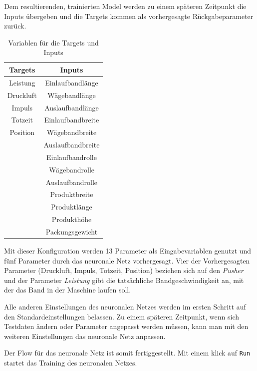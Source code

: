 Dem resultierenden, trainierten Model werden zu einem späteren Zeitpunkt die Inputs übergeben und die Targets kommen als
vorhergesagte Rückgabeparameter zurück.

\begin{table}[h]
    \centering
    \begin{tabular}{|c|c|}
        \hline
        \textbf{Targets} & \textbf{Inputs}\\
        \hline
        \hline
        Leistung & Einlaufbandlänge\\
        \hline
        Druckluft & Wägebandlänge\\
        \hline
        Impuls & Auslaufbandlänge\\
        \hline
        Totzeit & Einlaufbandbreite\\
        \hline
        Position & Wägebandbreite\\
        \hline
        & Auslaufbandbreite\\
        \hline
        & Einlaufbandrolle\\
        \hline
        & Wägebandrolle\\
        \hline
        & Auslaufbandrolle\\
        \hline
        & Produktbreite\\
        \hline
        & Produktlänge\\
        \hline
        & Produkthöhe\\
        \hline
        & Packungsgewicht\\
        \hline
    \end{tabular}
    \caption{Variablen für die Targets und Inputs}
    \label{tab:targets_inputs}
\end{table}

Mit dieser Konfiguration werden 13 Parameter als Eingabevariablen genutzt und fünf Parameter durch das neuronale Netz
vorhergesagt. Vier der Vorhergesagten Parameter (Druckluft, Impuls, Totzeit, Position) beziehen sich auf den
\textit{Pusher} und der Parameter \textit{Leistung} gibt die tatsächliche Bandgeschwindigkeit an, mit der das Band in der
Maschine laufen soll.

Alle anderen Einstellungen des neuronalen Netzes werden im ersten Schritt auf den Standardeinstellungen belassen. Zu einem
späteren Zeitpunkt, wenn sich Testdaten ändern oder Parameter angepasst werden müssen, kann man mit den weiteren
Einstellungen das neuronale Netz anpassen.

Der Flow für das neuronale Netz ist somit fertiggestellt. Mit einem klick auf \texttt{Run} startet das Training des
neuronalen Netzes.

